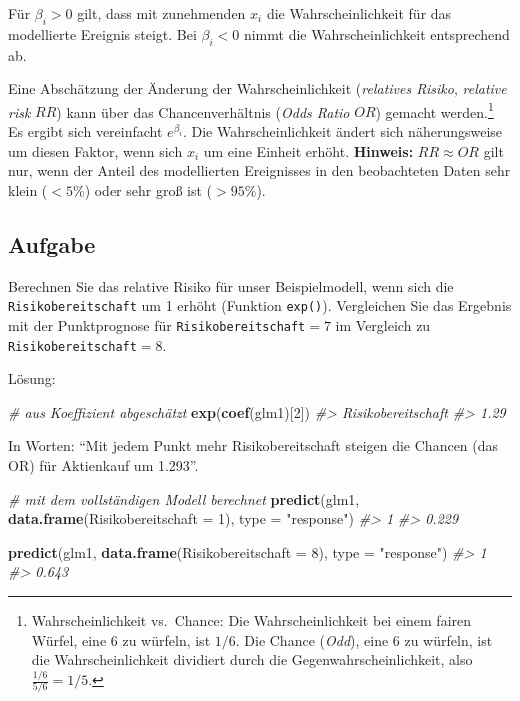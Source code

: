 \documentclass[12pt,ngerman,]{book}
\makeatletter
\newenvironment{Shaded}{\begin{snugshade}}{\end{snugshade}}
\newcommand{\KeywordTok}[1]{\textcolor[rgb]{0.13,0.29,0.53}{\textbf{{#1}}}}
\newcommand{\DataTypeTok}[1]{\textcolor[rgb]{0.13,0.29,0.53}{{#1}}}
\newcommand{\DecValTok}[1]{\textcolor[rgb]{0.00,0.00,0.81}{{#1}}}
\newcommand{\StringTok}[1]{\textcolor[rgb]{0.31,0.60,0.02}{{#1}}}
\newcommand{\CommentTok}[1]{\textcolor[rgb]{0.56,0.35,0.01}{\textit{{#1}}}}
\newcommand{\NormalTok}[1]{{#1}}
\let\rmarkdownfootnote\footnote%
\def\footnote{\protect\rmarkdownfootnote}
\newenvironment{kframe}{%
\medskip{}
\setlength{\fboxsep}{.8em}
 \def\at@end@of@kframe{}%
 \ifinner\ifhmode%
  \def\at@end@of@kframe{\end{minipage}}%
  \begin{minipage}{\columnwidth}%
 \fi\fi%
 \def\FrameCommand##1{\hskip\@totalleftmargin \hskip-\fboxsep
 \colorbox{shadecolor}{##1}\hskip-\fboxsep
     \hskip-\linewidth \hskip-\@totalleftmargin \hskip\columnwidth}%
 \MakeFramed {\advance\hsize-\width
   \@totalleftmargin\z@ \linewidth\hsize
   \@setminipage}}%
 {\par\unskip\endMakeFramed%
 \at@end@of@kframe}
\renewenvironment{Shaded}{\begin{kframe}}{\end{kframe}}
\makeatother
\begin{document}
Für \(\beta_i>0\) gilt, dass mit zunehmenden \(x_i\) die
Wahrscheinlichkeit für das modellierte Ereignis steigt. Bei
\(\beta_i<0\) nimmt die Wahrscheinlichkeit entsprechend ab.

Eine Abschätzung der Änderung der Wahrscheinlichkeit (\emph{relatives
Risiko}, \emph{relative risk} \(RR\)) kann über das Chancenverhältnis
(\emph{Odds Ratio} \(OR\)) gemacht werden.\footnote{Wahrscheinlichkeit
  vs.~Chance: Die Wahrscheinlichkeit bei einem fairen Würfel, eine 6 zu
  würfeln, ist \(1/6\). Die Chance (\emph{Odd}), eine 6 zu würfeln, ist
  die Wahrscheinlichkeit dividiert durch die Gegenwahrscheinlichkeit,
  also \(\frac{1/6}{5/6}=1/5\).} Es ergibt sich vereinfacht
\(e^{\beta_i}\). Die Wahrscheinlichkeit ändert sich näherungsweise um
diesen Faktor, wenn sich \(x_i\) um eine Einheit erhöht.
\textbf{Hinweis:} \(RR\approx OR\) gilt nur, wenn der Anteil des
modellierten Ereignisses in den beobachteten Daten sehr klein (\(<5\%\))
oder sehr groß ist (\(>95\%\)).

\subsection{Aufgabe}\label{aufgabe}

Berechnen Sie das relative Risiko für unser Beispielmodell, wenn sich
die \texttt{Risikobereitschaft} um 1 erhöht (Funktion \texttt{exp()}).
Vergleichen Sie das Ergebnis mit der Punktprognose für
\texttt{Risikobereitschaft}\(=7\) im Vergleich zu
\texttt{Risikobereitschaft}\(=8\).

Lösung:

\begin{Shaded}
\begin{Highlighting}[]
\CommentTok{# aus Koeffizient abgeschätzt}
\KeywordTok{exp}\NormalTok{(}\KeywordTok{coef}\NormalTok{(glm1)[}\DecValTok{2}\NormalTok{])}
\CommentTok{#> Risikobereitschaft }
\CommentTok{#>               1.29}
\end{Highlighting}
\end{Shaded}

In Worten: ``Mit jedem Punkt mehr Risikobereitschaft steigen die Chancen
(das OR) für Aktienkauf um 1.293''.

\begin{Shaded}
\begin{Highlighting}[]

\CommentTok{# mit dem vollständigen Modell berechnet}
\KeywordTok{predict}\NormalTok{(glm1, }\KeywordTok{data.frame}\NormalTok{(}\DataTypeTok{Risikobereitschaft =} \DecValTok{1}\NormalTok{), }
        \DataTypeTok{type =} \StringTok{"response"}\NormalTok{)}
\CommentTok{#>     1 }
\CommentTok{#> 0.229}

\KeywordTok{predict}\NormalTok{(glm1, }\KeywordTok{data.frame}\NormalTok{(}\DataTypeTok{Risikobereitschaft =} \DecValTok{8}\NormalTok{), }
        \DataTypeTok{type =} \StringTok{"response"}\NormalTok{)}
\CommentTok{#>     1 }
\CommentTok{#> 0.643}
\end{Highlighting}
\end{Shaded}
\end{document}
